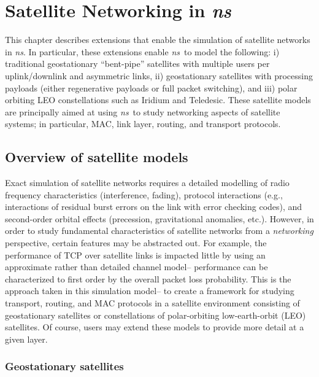 \chapter{Satellite Networking in \emph{ns}}
\label{chap:satellite}

This chapter describes extensions that enable the simulation of satellite
networks in \emph{ns}.  In particular, these extensions enable \emph{ns}~to model
the following:  i) traditional geostationary ``bent-pipe'' satellites with 
multiple users per uplink/downlink and asymmetric links, ii) geostationary 
satellites with processing payloads (either regenerative payloads or full 
packet switching), and iii) polar orbiting LEO constellations such as 
Iridium and Teledesic.  These satellite models are principally aimed at 
using \emph{ns}~to study networking aspects of satellite systems; in particular, 
MAC, link layer, routing, and transport protocols.  




\section{Overview of satellite models}
\label{sec:satellite/overview}

Exact simulation of satellite networks requires a
detailed modelling of radio frequency characteristics (interference, fading),
protocol interactions (e.g., interactions of residual burst errors on the 
link with error checking codes), and second-order orbital effects (precession,
gravitational anomalies, etc.).  However, in order to study fundamental
characteristics of satellite networks from a {\em networking} perspective,
certain features may be abstracted out.  For example, the performance of
TCP over satellite links is impacted little by using an approximate rather than 
detailed channel model-- performance can be characterized to first order
by the overall packet loss probability.  This is the approach taken in this
simulation model-- to create a framework for studying transport, 
routing, and MAC protocols in a satellite environment consisting of
geostationary satellites or constellations of polar-orbiting 
low-earth-orbit (LEO) satellites.  Of course, users may extend these models
to provide more detail at a given layer.   


\subsection{Geostationary satellites}
\label{sec:satellite/overview/geo}

